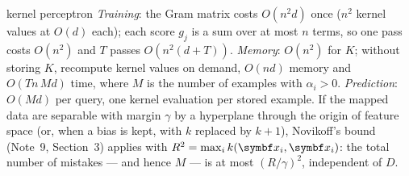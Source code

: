\documentclass[11pt]{article}
\begin{document}
\begin{runtime}{kernel perceptron}
\emph{Training}: the Gram matrix costs $O(n^2 d)$ once ($n^2$ kernel values at $O(d)$ each); each score $g_j$ is a sum
over at most $n$ terms, so one pass costs $O(n^2)$ and $T$ passes $O(n^2(d + T))$. \emph{Memory}: $O(n^2)$ for $K$;
without storing $K$, recompute kernel values on demand, $O(nd)$ memory and $O(Tn\,M d)$ time, where $M$ is the number of
examples with $\alpha_i > 0$. \emph{Prediction}: $O(M d)$ per query, one kernel evaluation per stored example. If the
mapped data are separable with margin $\gamma$ by a hyperplane through the origin of feature space (or, when a bias is
kept, with $k$ replaced by $k + 1$), Novikoff's bound (Note~9, Section~3) applies with $R^2 = \max_i k(\x_i, \x_i)$: the
total number of mistakes --- and hence $M$ --- is at most $(R/\gamma)^2$, independent of $D$.
\end{runtime}
\end{document}
